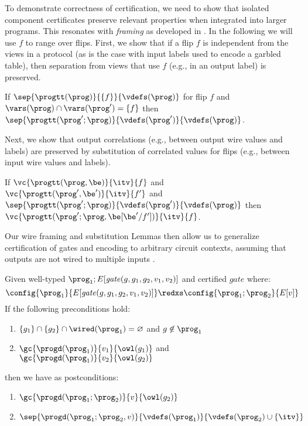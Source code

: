 To demonstrate correctness of certification, we need to show that
isolated component certificates preserve relevant properties
when integrated into larger programs. This resonates with
\emph{framing} as developed in \cite{barthe2019probabilistic}.
In the following we will use $f$ to range over flips.
First, we show that if a flip $f$ is independent from the views
in a protocol (as is the case with input labels used to
encode a garbled table), then separation from views that
use $f$ (e.g., in an output label) is preserved. 
\begin{lemma}
  \label{lemma-wire-framing}
  If $\sep{\progtt(\prog)}{\{f\}}{\vdefs(\prog)}$ for flip $f$ and
  $\vars(\prog) \cap \vars(\prog') = \{ f \}$ then
  $\sep{\progtt(\prog';\prog)}{\vdefs(\prog')}{\vdefs(\prog)}$.
\end{lemma}
Next, we show that output correlations (e.g., between output wire values and
labels) are preserved by substitution of correlated values for flips (e.g.,
between input wire values and labels).
\begin{lemma}[Substitution]
  \label{lemma-substitution}
  If $\vc{\progtt(\prog,\be)}{\itv}{f}$ and $\vc{\progtt(\prog',\be')}{\itv}{f'}$
  and $\sep{\progtt(\prog';\prog)}{\vdefs(\prog')}{\vdefs(\prog)}$
  then $\vc{\progtt(\prog';\prog,\be[\be'/f'])}{\itv}{f}$.
\end{lemma}
Our wire framing and substitution Lemmas then allow us to generalize
certification of gates and encoding to arbitrary circuit contexts,
assuming that outputs are not wired to multiple inputs \cite{tate2003garbled,nieminen2023breaking}.
\begin{lemma}
  \label{lemma-compose}
Given well-typed $\prog_1;E[\mathit{gate}(g,g_1,g_2,v_1,v_2)]$ and certified $\mathit{gate}$ where:
$$
\config{\prog_1}{E[\mathit{gate}(g,g_1,g_2,v_1,v_2)]} \redxs \config{\prog_1;\prog_2}{E[v]}
$$
If the following preconditions hold:
\begin{enumerate}
\item $\{ g_1 \} \cap \{ g_2 \} \cap \wired(\prog_1) = \varnothing$ and $g \not\in \prog_1$
\item $\gc{\progd(\prog_1)}{v_1}{\owl(g_1)}$ and $\gc{\progd(\prog_1)}{v_2}{\owl(g_2)}$
\end{enumerate}
then we have as postconditions:
\begin{enumerate}
  \item $\gc{\progd(\prog_1;\prog_2)}{v}{\owl(g_2)}$
  \item $\sep{\progd(\prog_1;\prog_2,v)}{\vdefs(\prog_1)}{\vdefs(\prog_2) \cup \{\itv\}}$
\end{enumerate}
\end{lemma}
